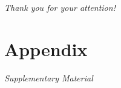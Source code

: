 \documentclass[10pt]{beamer}
\begin{document}
	\begin{frame}{}
	\label{frame:thankyouslide}
		\vfill
	  \centering 
	  {\Huge\color{red} 
	  \emph{Thank you for your attention!}}
		\vfill
		\centering
	\end{frame}






\appendix
\renewcommand{\insertframenumber}{\Alph{framenumber}}


\section{Appendix}
\begin{frame}
	\begin{center}
	\Huge\emph{Supplementary Material}
	\end{center}
\end{frame}
\addtocounter{framenumber}{-1}
\end{document}
